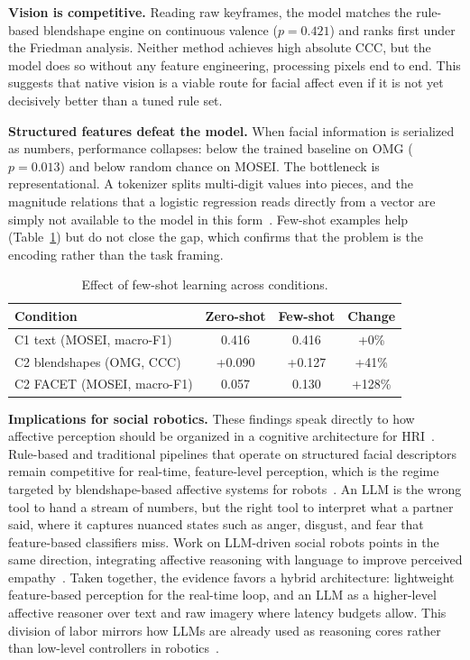 \documentclass[conference]{IEEEtran}
\begin{document}
\textbf{Vision is competitive.} Reading raw keyframes, the model matches the rule-based blendshape engine on continuous valence ($p=0.421$) and ranks first under the Friedman analysis. Neither method achieves high absolute CCC, but the model does so without any feature engineering, processing pixels end to end. This suggests that native vision is a viable route for facial affect even if it is not yet decisively better than a tuned rule set.

\textbf{Structured features defeat the model.} When facial information is serialized as numbers, performance collapses: below the trained baseline on OMG ($p=0.013$) and below random chance on MOSEI. The bottleneck is representational. A tokenizer splits multi-digit values into pieces, and the magnitude relations that a logistic regression reads directly from a vector are simply not available to the model in this form~\cite{Survey2024TextCentric}. Few-shot examples help (Table~\ref{tab:fewshot}) but do not close the gap, which confirms that the problem is the encoding rather than the task framing.

\begin{table}[htbp]
\caption{Effect of few-shot learning across conditions.}
\label{tab:fewshot}
\centering
\setlength{\tabcolsep}{4pt}
\renewcommand{\arraystretch}{1.15}
\small
\begin{tabular}{l c c c}
\hline
\textbf{Condition} & \textbf{Zero-shot} & \textbf{Few-shot} & \textbf{Change} \\
\hline
C1 text (MOSEI, macro-F1) & 0.416 & 0.416 & +0\% \\
C2 blendshapes (OMG, CCC) & +0.090 & +0.127 & +41\% \\
C2 FACET (MOSEI, macro-F1) & 0.057 & 0.130 & +128\% \\
\hline
\end{tabular}
\end{table}

\textbf{Implications for social robotics.} These findings speak directly to how affective perception should be organized in a cognitive architecture for HRI~\cite{Goodrich2007HRISurvey, Breazeal2003SociableRobots}. Rule-based and traditional pipelines that operate on structured facial descriptors remain competitive for real-time, feature-level perception, which is the regime targeted by blendshape-based affective systems for robots~\cite{Spitale2024AffectiveRobotics}. An LLM is the wrong tool to hand a stream of numbers, but the right tool to interpret what a partner said, where it captures nuanced states such as anger, disgust, and fear that feature-based classifiers miss. Work on LLM-driven social robots points in the same direction, integrating affective reasoning with language to improve perceived empathy~\cite{Magalhaes2024Nadine, Churamani2024EmpathicGrounding}. Taken together, the evidence favors a hybrid architecture: lightweight feature-based perception for the real-time loop, and an LLM as a higher-level affective reasoner over text and raw imagery where latency budgets allow. This division of labor mirrors how LLMs are already used as reasoning cores rather than low-level controllers in robotics~\cite{Ahn2022SayCan, Zitkovich2023RT2, Kawaharazuka2024RobotLLMSurvey}.
\end{document}
